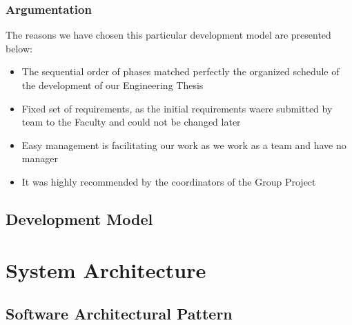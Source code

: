 \documentclass[a4paper,11pt,twoside]{report}
\theoremstyle{definition}
\begin{document}
\subsection{Argumentation}

The reasons we have chosen this particular development model are presented below:
\begin{itemize}
\item The sequential order of phases matched perfectly the organized schedule of the development of our Engineering Thesis

\item Fixed set of requirements, as the initial requirements waere submitted by team to the Faculty and could not be changed later
\item Easy management is facilitating our work as we work as a team and have no manager
\item It was highly recommended by the coordinators of the Group Project
\end{itemize}


\section{Development Model}






\chapter{System Architecture}



\section{Software Architectural Pattern}
\end{document}
